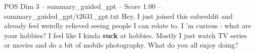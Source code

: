 \begin{textsample}{POS Dim 3 – summary\_guided\_gpt – Score 1.00 – summary\_guided\_gpt/t2631\_gpt.txt}  \label{ex:f3_pos_027}
Hey, I just joined this subreddit and already feel weirdly relieved seeing people I can relate to.
I ’m curious : what are your hobbies?
I feel like I kinda \textbf{suck} at hobbies.
Mostly I just watch TV series or movies and do a bit of mobile photography.
What do you all enjoy doing?

\end{textsample}
